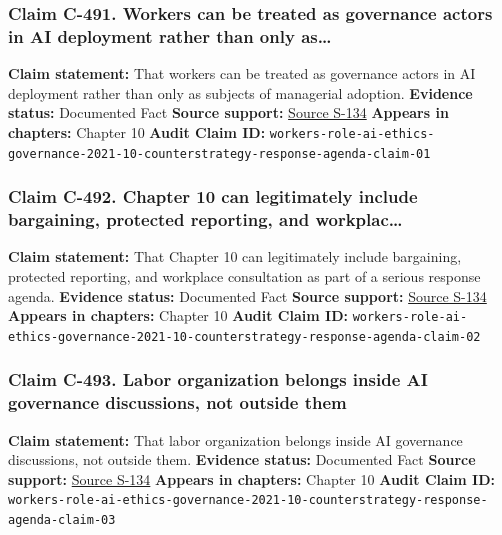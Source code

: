 \documentclass[
  american,
  11pt,
  letterpaper,
]{article}
\begin{document}
\subsubsection{Claim C-491. Workers can be treated as governance actors
in AI deployment rather than only
as\ldots{}}\label{claim-c-491-workers-can-be-treated-as-governance-actors-in-ai-deployment-rather-than-only-as}

\textbf{Claim statement:} That workers can be treated as governance
actors in AI deployment rather than only as subjects of managerial
adoption. \textbf{Evidence status:} Documented Fact \textbf{Source
support:}
\hyperref[source-s-134-in-oxford-handbook-on-ai-governance-the-role-of-workers-in-ai-ethics-and-governance]{Source
S-134} \textbf{Appears in chapters:} Chapter 10 \textbf{Audit Claim ID:}
\texttt{workers-role-ai-ethics-governance-2021-10-counterstrategy-response-agenda-claim-01}

\subsubsection{Claim C-492. Chapter 10 can legitimately include
bargaining, protected reporting, and
workplac\ldots{}}\label{claim-c-492-chapter-10-can-legitimately-include-bargaining-protected-reporting-and-workplac}

\textbf{Claim statement:} That Chapter 10 can legitimately include
bargaining, protected reporting, and workplace consultation as part of a
serious response agenda. \textbf{Evidence status:} Documented Fact
\textbf{Source support:}
\hyperref[source-s-134-in-oxford-handbook-on-ai-governance-the-role-of-workers-in-ai-ethics-and-governance]{Source
S-134} \textbf{Appears in chapters:} Chapter 10 \textbf{Audit Claim ID:}
\texttt{workers-role-ai-ethics-governance-2021-10-counterstrategy-response-agenda-claim-02}

\subsubsection{Claim C-493. Labor organization belongs inside AI
governance discussions, not outside
them}\label{claim-c-493-labor-organization-belongs-inside-ai-governance-discussions-not-outside-them}

\textbf{Claim statement:} That labor organization belongs inside AI
governance discussions, not outside them. \textbf{Evidence status:}
Documented Fact \textbf{Source support:}
\hyperref[source-s-134-in-oxford-handbook-on-ai-governance-the-role-of-workers-in-ai-ethics-and-governance]{Source
S-134} \textbf{Appears in chapters:} Chapter 10 \textbf{Audit Claim ID:}
\texttt{workers-role-ai-ethics-governance-2021-10-counterstrategy-response-agenda-claim-03}
\end{document}

